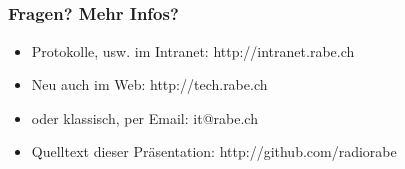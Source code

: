 \documentclass{beamer}
\begin{document}
  \subsection*{}

  \frame
  {
    \frametitle{Fragen? Mehr Infos?}

    \begin{itemize}
    \item{Protokolle, usw. im Intranet: http://intranet.rabe.ch}
    \item{Neu auch im Web: http://tech.rabe.ch}
    \item{oder klassisch, per Email: it@rabe.ch}
    \item{Quelltext dieser Pr\"asentation: http://github.com/radiorabe}
    \end{itemize}
    
  }
\end{document}
